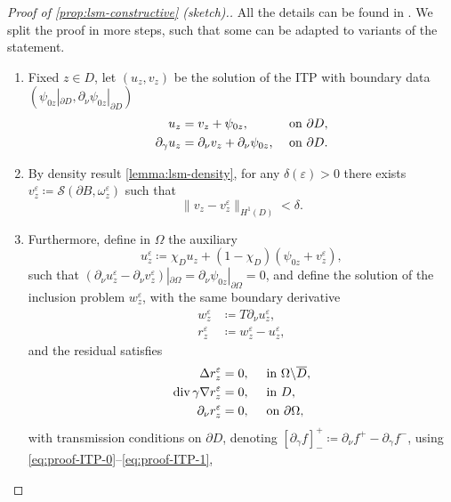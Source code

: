 \documentclass[10pt, a4paper, twoside, openright]{book}
\theoremstyle{definition}
\theoremstyle{plain}
\theoremstyle{plain}
\theoremstyle{plain}
\theoremstyle{plain}
\theoremstyle{plain}
\theoremstyle{plain}
\theoremstyle{plain}
\theoremstyle{plain}
\DeclareMathOperator{\divergence}{div}
\let\epsilon\varepsilon
\begin{document}
\begin{proof}
 [Proof of \ref{prop:lsm-constructive} (sketch).]
 All the details can be found in \cite{somersalo:preprint}. We split the proof in more steps, such that some can be adapted to variants of the statement.
 \begin{enumerate}
  \item Fixed $z\in D$, let $(u_z, v_z)$ be the solution of the ITP with boundary data $(\psi_{0z}|_{\partial D}, \partial_\nu\psi_{0z}|_{\partial D})$
  \begin{subequations}
  \begin{align}
   u_z &= v_z + \psi_{0z}, &&\textup{ on }\partial D,  \label{eq:proof-ITP-0} \\
   \partial_\gamma u_z &= \partial_\nu v_z + \partial_\nu \psi_{0z}, &&\textup{ on }\partial D. \label{eq:proof-ITP-1}
  \end{align}
  \end{subequations}
  \item By density result \ref{lemma:lsm-density}, for any $\delta(\epsilon)>0$ there exists $v^\epsilon_z\coloneqq\mathcal{S}(\partial B, \omega^\epsilon_z)$ such that
  \begin{equation}
   \|v_z-v_z^\epsilon\|_{H^1(D)}<\delta.
  \end{equation}
  \item Furthermore, define in $\Omega$ the auxiliary 
  \begin{equation}
   u^\epsilon_z\coloneqq\chi_Du_z + (1-\chi_D)(\psi_{0z} + v^\epsilon_z),
  \end{equation}
  such that $(\partial_\nu u^\epsilon_z -\partial_\nu v^\epsilon_z )|_{\partial\Omega}=\partial_\nu\psi_{0z}|_{\partial\Omega}=0$, and define the solution of the inclusion problem $w^\epsilon_z$, with the same boundary derivative
  \begin{align}
   w^\epsilon_z&\coloneqq T\partial_\nu u^\epsilon_z, \\
   r^\epsilon_z&\coloneqq w^\epsilon_z - u^\epsilon_z,
  \end{align}
  and the residual satisfies 
  \begin{align}
  \Delta r^\epsilon_z & = 0, \quad \textup{ in }\Omega\backslash\overline{D}, \\
  \divergence\gamma\nabla r^\epsilon_z &= 0,  \quad \textup{ in }D, \\
  \partial_\nu r^\epsilon_z &=0, \quad \textup{ on }\partial \Omega,
  \end{align}
  with transmission conditions on $\partial D$, denoting $[\partial_\gamma f]^+_- \coloneqq \partial_\nu f^+ - \partial_\gamma f^-$, using \eqref{eq:proof-ITP-0}--\eqref{eq:proof-ITP-1},

\end{enumerate}
\end{proof}
\end{document}
